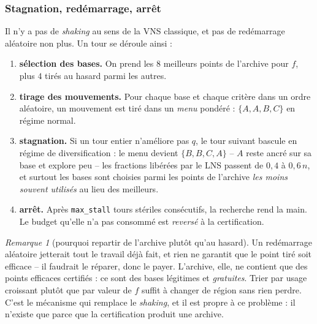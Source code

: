 \documentclass[11pt,a4paper]{article}
\theoremstyle{plain}
\theoremstyle{remark}
\newtheorem{remark}{Remarque}
\begin{document}
\subsubsection*{Stagnation, redémarrage, arrêt}

Il n'y a pas de \emph{shaking} au sens de la VNS classique, et pas de
redémarrage aléatoire non plus. Un tour se déroule ainsi :

\begin{enumerate}
\item \textbf{sélection des bases.} On prend les $8$ meilleurs points de
  l'archive pour $f$, plus $4$ tirés au hasard parmi les autres.
\item \textbf{tirage des mouvements.} Pour chaque base et chaque critère
  dans un ordre aléatoire, un mouvement est tiré dans un \emph{menu}
  pondéré : $\{A,A,B,C\}$ en régime normal.
\item \textbf{stagnation.} Si un tour entier n'améliore pas $q$, le tour
  suivant bascule en régime de diversification : le menu devient
  $\{B,B,C,A\}$ -- $A$ reste ancré sur sa base et explore peu -- les
  fractions libérées par le LNS passent de $0{,}4$ à $0{,}6\,n$, et surtout
  les bases sont choisies parmi les points de l'archive \emph{les moins
  souvent utilisés} au lieu des meilleurs.
\item \textbf{arrêt.} Après \texttt{max\_stall} tours stériles consécutifs,
  la recherche rend la main. Le budget qu'elle n'a pas consommé est
  \emph{reversé} à la certification.
\end{enumerate}

\begin{remark}[pourquoi repartir de l'archive plutôt qu'au hasard]
Un redémarrage aléatoire jetterait tout le travail déjà fait, et rien ne
garantit que le point tiré soit efficace -- il faudrait le réparer, donc le
payer. L'archive, elle, ne contient que des points efficaces certifiés :
ce sont des bases légitimes et \emph{gratuites}. Trier par usage croissant
plutôt que par valeur de $f$ suffit à changer de région sans rien perdre.
C'est le mécanisme qui remplace le \emph{shaking}, et il est propre à ce
problème : il n'existe que parce que la certification produit une archive.
\end{remark}
\end{document}
